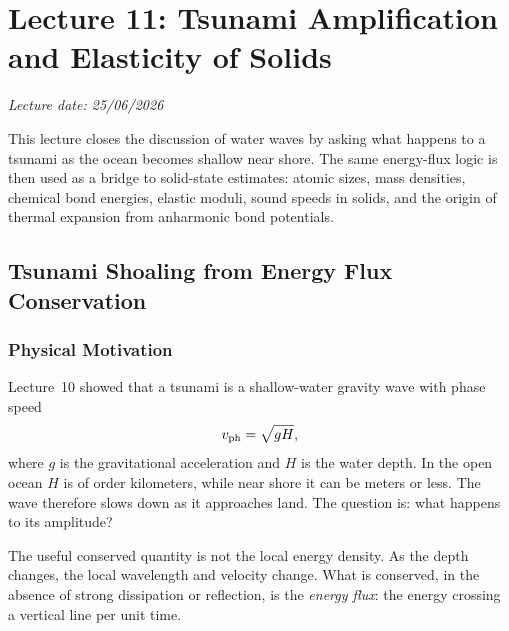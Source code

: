 \section{Lecture 11: Tsunami Amplification and Elasticity of Solids}
\label{sec:lec11}
\date{25/06/2026}

\begin{center}
    \textit{Lecture date: 25/06/2026}
\end{center}

This lecture closes the discussion of water waves by asking what happens to a
tsunami as the ocean becomes shallow near shore. The same energy-flux logic is
then used as a bridge to solid-state estimates: atomic sizes, mass densities,
chemical bond energies, elastic moduli, sound speeds in solids, and the origin
of thermal expansion from anharmonic bond potentials.

\subsection{Tsunami Shoaling from Energy Flux Conservation}
\label{sec:lec11:tsunami-shoaling}

\subsubsection*{Physical Motivation}
Lecture~10 showed that a tsunami is a shallow-water gravity wave with phase
speed
\begin{equation}
    v_{\rm ph}=\sqrt{gH},
    \label{eq:lec11:shallow-speed}
\end{equation}
where $g$ is the gravitational acceleration and $H$ is the water depth. In the
open ocean $H$ is of order kilometers, while near shore it can be meters or
less. The wave therefore slows down as it approaches land. The question is:
what happens to its amplitude?

The useful conserved quantity is not the local energy density. As the depth
changes, the local wavelength and velocity change. What is conserved, in the
absence of strong dissipation or reflection, is the \emph{energy flux}: the
energy crossing a vertical line per unit time.

